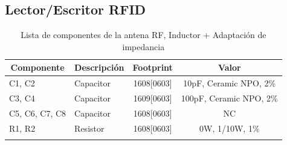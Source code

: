 \subsection{Lector/Escritor RFID}
\begin{longtable}{|l|l|c|c|}
\hline
\multicolumn{1}{|c|}{\textbf{Componente}} & \multicolumn{1}{c|}{\textbf{Descripción}} & \textbf{ Footprint} & \textbf{Valor} \\ \hline
C1, C2 & Capacitor & 1608[0603] & 10pF,   Ceramic NPO, 2\% \\ \hline
C3, C4 & Capacitor & 1609[0603] & 100pF, Ceramic NPO, 2\% \\ \hline
C5, C6, C7, C8 & Capacitor & 1608[0603] &  NC \\ \hline
R1,  R2 & Resistor & 1608[0603] & 0W,  1/10W,  1\% \\ \hline
\caption{Lista de componentes de la antena RF, Inductor + Adaptación de impedancia}
\label{}
\end{longtable}

